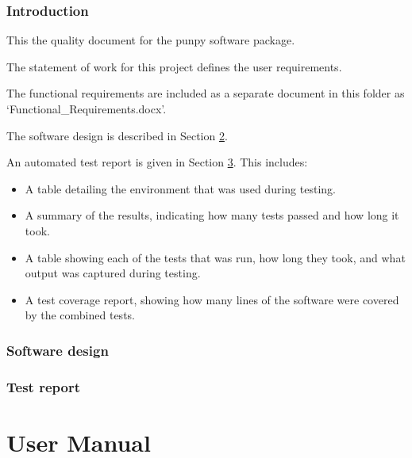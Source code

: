 \documentclass{article}
\begin{document}

\tableofcontents



\clearpage
\pagestyle{long}


\graphicspath{{images/}}
\graphicspath{{./}}

\section{Introduction}\label{introduction}

This the quality document for the punpy software package.


The statement of work for this project defines the user requirements.

The functional requirements are included as a separate document in this folder as `Functional\_Requirements.docx'.

The software design is described in Section \ref{design}.

An automated test report is given in Section \ref{testreport}. This includes:
\begin{itemize}
\item A table detailing the environment that was used during testing.
\item A summary of the results, indicating how many tests passed and how long it took.
\item A table showing each of the tests that was run, how long they took, and what output was captured during testing.
\item A test coverage report, showing how many lines of the software were covered by the combined tests.
\end{itemize}

\clearpage
\section{Software design}\label{design}



\clearpage
\section{Test report}\label{testreport}

%
%
%
%
%
%
\part*{User Manual}
{}
\appendix
\def\maketitle{}
\def\tableofcontents{}

\end{document}
